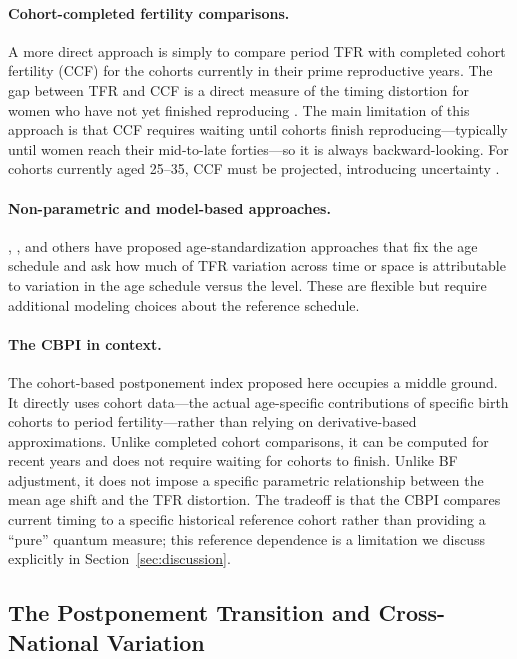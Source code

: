 \documentclass[12pt]{article}
\begin{document}
\paragraph{Cohort-completed fertility comparisons.}
A more direct approach is simply to compare period TFR with completed
cohort fertility (CCF) for the cohorts currently in their prime
reproductive years.  The gap between TFR and CCF is a direct measure
of the timing distortion for women who have not yet finished
reproducing \citep{Sobotka2011,Myrskyla2013}.  The main limitation of
this approach is that CCF requires waiting until cohorts finish
reproducing---typically until women reach their mid-to-late forties---so
it is always backward-looking.  For cohorts currently aged 25--35, CCF
must be projected, introducing uncertainty \citep{Beaujouan2019}.

\paragraph{Non-parametric and model-based approaches.}
\citet{Zeng2011}, \citet{Schoen2004}, and others have proposed
age-standardization approaches that fix the age schedule and ask how
much of TFR variation across time or space is attributable to
variation in the age schedule versus the level.  These are flexible
but require additional modeling choices about the reference schedule.

\paragraph{The CBPI in context.}
The cohort-based postponement index proposed here occupies a middle
ground.  It directly uses cohort data---the actual age-specific
contributions of specific birth cohorts to period fertility---rather
than relying on derivative-based approximations.  Unlike completed
cohort comparisons, it can be computed for recent years and does not
require waiting for cohorts to finish.  Unlike BF adjustment, it does
not impose a specific parametric relationship between the mean age
shift and the TFR distortion.  The tradeoff is that the CBPI compares
current timing to a specific historical reference cohort rather than
providing a ``pure'' quantum measure; this reference dependence is a
limitation we discuss explicitly in Section~\ref{sec:discussion}.

\subsection{The Postponement Transition and Cross-National Variation}
\end{document}
